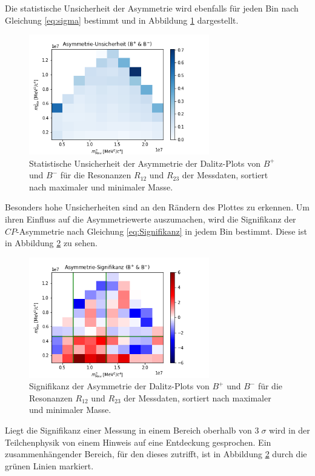 \FloatBarrier
Die statistische Unsicherheit der Asymmetrie wird ebenfalls für jeden Bin nach Gleichung \eqref{eq:sigma} bestimmt und in Abbildung \ref{fig:DalitzAsymmUnsi} dargestellt.
\begin{figure}
  \centering
  \includegraphics[width=0.7\textwidth]{plots/Asymm_Fehler_Dalitz.png}
  \caption{Statistische Unsicherheit der Asymmetrie der Dalitz-Plots von $B^{+}$ und $B^{-}$ für die Resonanzen $R_{12}$ und $R_{23}$ der Messdaten, sortiert nach maximaler und minimaler Masse.}
  \label{fig:DalitzAsymmUnsi}
\end{figure}
\FloatBarrier
Besonders hohe Unsicherheiten sind an den Rändern des Plottes zu erkennen. Um ihren Einfluss auf die Asymmetriewerte auszumachen, wird die Signifikanz der $CP$-Asymmetrie nach Gleichung \eqref{eq:Signifikanz} in jedem Bin bestimmt. Diese ist in Abbildung \ref{fig:DalitzSign} zu sehen.
\begin{figure}
  \centering
  \includegraphics[width=0.7\textwidth]{plots/Asymm_Sig_Dalitz.png}
  \caption{Signifikanz der Asymmetrie der Dalitz-Plots von $B^{+}$ und $B^{-}$ für die Resonanzen $R_{12}$ und $R_{23}$ der Messdaten, sortiert nach maximaler und minimaler Masse.}
  \label{fig:DalitzSign}
\end{figure}
\FloatBarrier
Liegt die Signifikanz einer Messung in einem Bereich oberhalb von $3\;\sigma$ wird in der Teilchenphysik von einem Hinweis auf eine Entdeckung gesprochen. Ein zusammenhängender Bereich, für den dieses zutrifft, ist in Abbildung \ref{fig:DalitzSign} durch die grünen Linien markiert.

